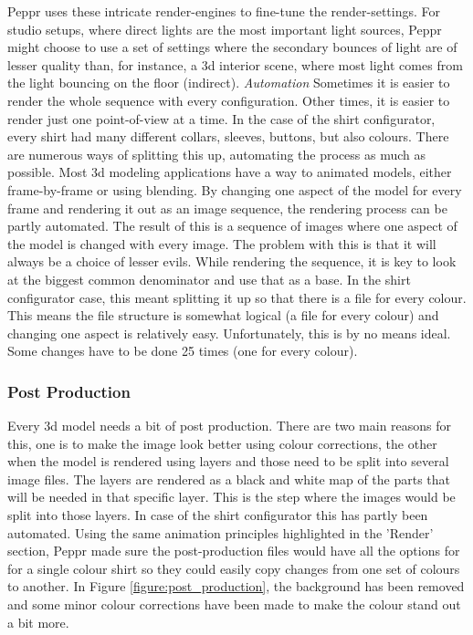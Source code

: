Peppr uses these intricate render-engines to fine-tune the render-settings. For studio setups, where direct lights are the most important light sources, Peppr might choose to use a set of settings where the secondary bounces of light are of lesser quality than, for instance, a 3d interior scene, where most light comes from the light bouncing on the floor (indirect).
\newline
\newline
\textit{Automation}
\newline
Sometimes it is easier to render the whole sequence with every configuration. Other times, it is easier to render just one point-of-view at a time. In the case of the shirt configurator, every shirt had many different collars, sleeves, buttons, but also colours. There are numerous ways of splitting this up, automating the process as much as possible. Most 3d modeling applications have a way to animated models, either frame-by-frame or using blending. By changing one aspect of the model for every frame and rendering it out as an image sequence, the rendering process can be partly automated. The result of this is a sequence of images where one aspect of the model is changed with every image. The problem with this is that it will always be a choice of lesser evils. While rendering the sequence, it is key to look at the biggest common denominator and use that as a base. In the shirt configurator case, this meant splitting it up so that there is a file for every colour. This means the file structure is somewhat logical (a file for every colour) and changing one aspect is relatively easy. Unfortunately, this is by no means ideal. Some changes have to be done 25 times (one for every colour).


\subsubsection{Post Production}
Every 3d model needs a bit of post production. There are two main reasons for this, one is to make the image look better using colour corrections, the other when the model is rendered using layers and those need to be split into several image files. The layers are rendered as a black and white map of the parts that will be needed in that specific layer. This is the step where the images would be split into those layers. In case of the shirt configurator this has partly been automated. Using the same animation principles highlighted in the 'Render' section, Peppr made sure the post-production files would have all the options for for a single colour shirt so they could easily copy changes from one set of colours to another. In Figure \ref{figure:post_production}, the background has been removed and some minor colour corrections have been made to make the colour stand out a bit more.
\newline


